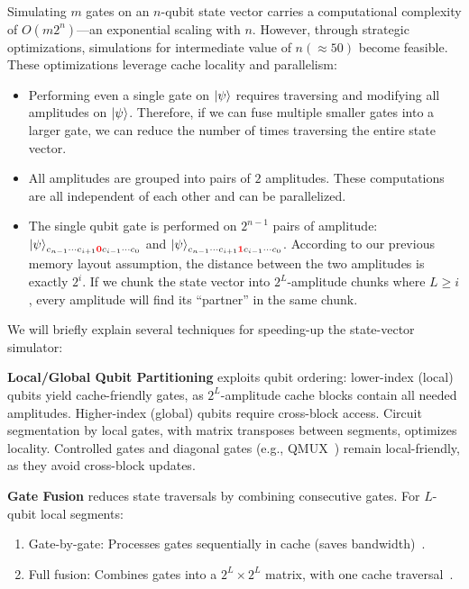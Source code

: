 \documentclass[a4paper,onecolumn,11pt,unpublished]{quantumarticle}
\begin{document}
Simulating $m$ gates on an $n$-qubit state vector carries a computational complexity of $O(m2^n)$---an exponential scaling with $n$. However, through strategic optimizations, simulations for intermediate value of $n( \approx 50)$ become feasible. These optimizations leverage cache locality and parallelism: 
\begin{itemize}
    \item Performing even a single gate on $\ket{\psi}$ requires traversing and modifying all amplitudes on $\ket{\psi}$. Therefore, if we can fuse multiple smaller gates into a larger gate, we can reduce the number of times traversing the entire state vector.
    \item All amplitudes are grouped into pairs of $2$ amplitudes. These computations are all independent of each other and can be parallelized.
    \item The single qubit gate is performed on $2^{n-1}$ pairs of amplitude: $\ket{\psi}_{c_{n-1}\cdots c_{i+1}\textbf{\color{red}0}c_{i-1}\cdots c_0}$ and $\ket{\psi}_{c_{n-1}\cdots c_{i+1}\textbf{\color{red}1}c_{i-1}\cdots c_0}$. According to our previous memory layout assumption, the distance between the two amplitudes is exactly $2^i$. If we chunk the state vector into $2^L$-amplitude chunks where $L\geq i$, every amplitude will find its ``partner'' in the same chunk.
\end{itemize}

We will briefly explain several techniques for speeding-up the state-vector simulator:

\textbf{Local/Global Qubit Partitioning} exploits qubit ordering: lower-index (local) qubits yield cache-friendly gates, as $2^L$-amplitude cache blocks contain all needed amplitudes. Higher-index (global) qubits require cross-block access. Circuit segmentation by local gates, with matrix transposes between segments, optimizes locality. Controlled gates and diagonal gates (e.g., QMUX~\cite{Shende2006Synthesis}) remain local-friendly, as they avoid cross-block updates.


\textbf{Gate Fusion} reduces state traversals by combining consecutive gates. For $L$-qubit local segments:
\begin{enumerate}
\item Gate-by-gate: Processes gates sequentially in cache (saves bandwidth)~\cite{smelyanskiyQHiPSTERQuantumHigh2016}.
\item Full fusion: Combines gates into a $2^L{\times}2^L$ matrix, with one cache traversal~\cite{bayraktarCuQuantumSDKHighPerformance2023}.
\end{enumerate}
\end{document}
